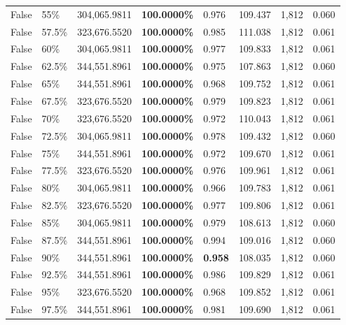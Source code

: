 \begin{table}[H]
\begin{tabular}{lllrllll}
\cline{1-8} \cline{2-8}
False & 55\% & \color{red} 304,065.9811 & \bfseries \color{red} 100.0000\% & 0.976 & 109.437 & 1,812 & 0.060 \\
\cline{1-8} \cline{2-8}
False & 57.5\% & 323,676.5520 & \bfseries \color{red} 100.0000\% & 0.985 & 111.038 & 1,812 & 0.061 \\
\cline{1-8} \cline{2-8}
False & 60\% & \color{red} 304,065.9811 & \bfseries \color{red} 100.0000\% & 0.977 & 109.833 & 1,812 & 0.061 \\
\cline{1-8} \cline{2-8}
False & 62.5\% & 344,551.8961 & \bfseries \color{red} 100.0000\% & 0.975 & 107.863 & 1,812 & 0.060 \\
\cline{1-8} \cline{2-8}
False & 65\% & 344,551.8961 & \bfseries \color{red} 100.0000\% & 0.968 & 109.752 & 1,812 & 0.061 \\
\cline{1-8} \cline{2-8}
False & 67.5\% & 323,676.5520 & \bfseries \color{red} 100.0000\% & 0.979 & 109.823 & 1,812 & 0.061 \\
\cline{1-8} \cline{2-8}
False & 70\% & 323,676.5520 & \bfseries \color{red} 100.0000\% & 0.972 & 110.043 & 1,812 & 0.061 \\
\cline{1-8} \cline{2-8}
False & 72.5\% & \color{red} 304,065.9811 & \bfseries \color{red} 100.0000\% & 0.978 & 109.432 & 1,812 & 0.060 \\
\cline{1-8} \cline{2-8}
False & 75\% & 344,551.8961 & \bfseries \color{red} 100.0000\% & 0.972 & 109.670 & 1,812 & 0.061 \\
\cline{1-8} \cline{2-8}
False & 77.5\% & 323,676.5520 & \bfseries \color{red} 100.0000\% & 0.976 & 109.961 & 1,812 & 0.061 \\
\cline{1-8} \cline{2-8}
False & 80\% & \color{red} 304,065.9811 & \bfseries \color{red} 100.0000\% & 0.966 & 109.783 & 1,812 & 0.061 \\
\cline{1-8} \cline{2-8}
False & 82.5\% & 323,676.5520 & \bfseries \color{red} 100.0000\% & 0.977 & 109.806 & 1,812 & 0.061 \\
\cline{1-8} \cline{2-8}
False & 85\% & \color{red} 304,065.9811 & \bfseries \color{red} 100.0000\% & 0.979 & 108.613 & 1,812 & 0.060 \\
\cline{1-8} \cline{2-8}
False & 87.5\% & 344,551.8961 & \bfseries \color{red} 100.0000\% & 0.994 & 109.016 & 1,812 & 0.060 \\
\cline{1-8} \cline{2-8}
False & 90\% & 344,551.8961 & \bfseries \color{red} 100.0000\% & \bfseries \color{red} 0.958 & 108.035 & 1,812 & 0.060 \\
\cline{1-8} \cline{2-8}
False & 92.5\% & 344,551.8961 & \bfseries \color{red} 100.0000\% & 0.986 & 109.829 & 1,812 & 0.061 \\
\cline{1-8} \cline{2-8}
False & 95\% & 323,676.5520 & \bfseries \color{red} 100.0000\% & 0.968 & 109.852 & 1,812 & 0.061 \\
\cline{1-8} \cline{2-8}
False & 97.5\% & 344,551.8961 & \bfseries \color{red} 100.0000\% & 0.981 & 109.690 & 1,812 & 0.061 \\
\cline{1-8} \cline{2-8}
\bottomrule
\end{tabular}
\end{table}
